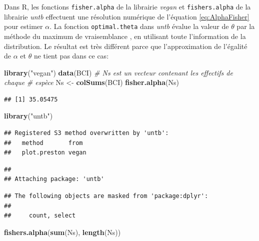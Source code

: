\documentclass[
  11pt,
  french,
  a4paper,
  extrafontsizes,onecolumn,openright
  ]{memoir}
\newenvironment{Shaded}{\begin{snugshade}}{\end{snugshade}}
\newcommand{\CommentTok}[1]{\textcolor[rgb]{0.56,0.35,0.01}{\textit{#1}}}
\newcommand{\KeywordTok}[1]{\textcolor[rgb]{0.13,0.29,0.53}{\textbf{#1}}}
\newcommand{\NormalTok}[1]{#1}
\newcommand{\StringTok}[1]{\textcolor[rgb]{0.31,0.60,0.02}{#1}}
\begin{document}
Dans R, les fonctions \texttt{fisher.alpha} de la librairie \emph{vegan} et \texttt{fishers.alpha} de la librairie \emph{untb} \autocite{Hankin2007} effectuent une résolution numérique de l'équation \eqref{eq:AlphaFisher} pour estimer \(\alpha\).
La fonction \texttt{optimal.theta} dans \emph{untb} évalue la valeur de \(\theta\) par la méthode du maximum de vraisemblance \autocite[page 122]{Hubbell2001}, en utilisant toute l'information de la distribution.
Le résultat est très différent parce que l'approximation de l'égalité de \(\alpha\) et \(\theta\) ne tient pas dans ce cas:

\scriptsize

\begin{Shaded}
\begin{Highlighting}[]
\KeywordTok{library}\NormalTok{(}\StringTok{"vegan"}\NormalTok{)}
\KeywordTok{data}\NormalTok{(BCI)}
\CommentTok{# Ns est un vecteur contenant les effectifs de chaque}
\CommentTok{# espèce}
\NormalTok{Ns <-}\StringTok{ }\KeywordTok{colSums}\NormalTok{(BCI)}
\KeywordTok{fisher.alpha}\NormalTok{(Ns)}
\end{Highlighting}
\end{Shaded}

\begin{verbatim}
## [1] 35.05475
\end{verbatim}

\begin{Shaded}
\begin{Highlighting}[]
\KeywordTok{library}\NormalTok{(}\StringTok{"untb"}\NormalTok{)}
\end{Highlighting}
\end{Shaded}

\begin{verbatim}
## Registered S3 method overwritten by 'untb':
##   method       from 
##   plot.preston vegan
\end{verbatim}

\begin{verbatim}
## 
## Attaching package: 'untb'
\end{verbatim}

\begin{verbatim}
## The following objects are masked from 'package:dplyr':
## 
##     count, select
\end{verbatim}

\begin{Shaded}
\begin{Highlighting}[]
\KeywordTok{fishers.alpha}\NormalTok{(}\KeywordTok{sum}\NormalTok{(Ns), }\KeywordTok{length}\NormalTok{(Ns))}
\end{Highlighting}
\end{Shaded}
\end{document}
